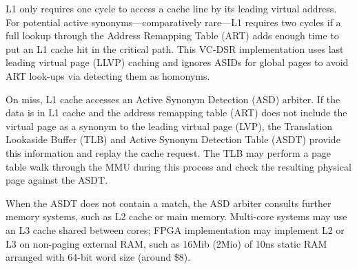 L1 only requires one cycle to access a cache line by its leading virtual address.  For potential active synonyms—comparatively rare—L1 requires two cycles if a full lookup through the Address Remapping Table (ART) adds enough time to put an L1 cache hit in the critical path.  This VC-DSR implementation uses last leading virtual page (LLVP) caching and ignores ASIDs for global pages to avoid ART look-ups via detecting them as homonyms.

On miss, L1 cache accesses an Active Synonym Detection (ASD) arbiter.  If the data is in L1 cache and the address remapping table (ART) does not include the virtual page as a synonym to the leading virtual page (LVP), the Translation Lookaside Buffer (TLB) and Active Synonym Detection Table (ASDT) provide this information and replay the cache request.  The TLB may perform a page table walk through the MMU during this process and check the resulting physical page against the ASDT.

When the ASDT does not contain a match, the ASD arbiter consults further memory systems, such as L2 cache or main memory.  Multi-core systems may use an L3 cache shared between cores; FPGA implementation may implement L2 or L3 on non-paging external RAM, such as 16Mib (2Mio) of 10ns static RAM arranged with 64-bit word size (around \$8).